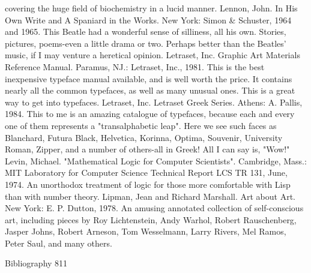   covering the huge field of biochemistry in a lucid manner.
Lennon, John. In His Own Write and A Spaniard in the Works. New York: Simon \&
  Schuster, 1964 and 1965. This Beatle had a wonderful sense of silliness, all his own.
  Stories, pictures, poems-even a little drama or two. Perhaps better than the Beatles' music, if
  I may venture a heretical opinion.
Letraset, Inc. Graphic Art Materials Reference Manual. Paramus, NJ.: Letraset, Inc., 1981.
  This is the best inexpensive typeface manual available, and is well worth the price. It
  contains nearly all the common typefaces, as well as many unusual ones. This is a great way
  to get into typefaces.
Letraset, Inc. Letraset Greek Series. Athens: A. Pallis, 1984. This to me is an amazing
  catalogue of typefaces, because each and every one of them represents a "transalphabetic
  leap". Here we see such faces as Blanchard, Futura Black, Helvetica, Korinna, Optima,
  Souvenir, University Roman, Zipper, and a number of others-all in Greek! All I can say is,
  "Wow!"
Levin, Michael. "Mathematical Logic for Computer Scientists". Cambridge, Mass.: MIT
  Laboratory for Computer Science Technical Report LCS TR 131, June, 1974. An
  unorthodox treatment of logic for those more comfortable with Lisp than with number
  theory.
Lipman, Jean and Richard Marshall. Art about Art. New York: E. P. Dutton, 1978. An
  amusing annotated collection of self-conscious art, including pieces by Roy Lichtenstein,
  Andy Warhol, Robert Rauschenberg, Jasper Johns, Robert Arneson, Tom Wesselmann,
  Larry Rivers, Mel Ramos, Peter Saul, and many others.

Bibliography                                                                                811

